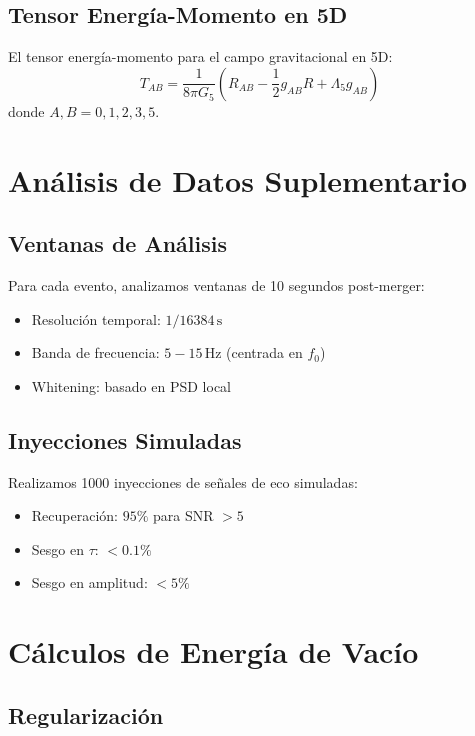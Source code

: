 \documentclass[12pt,a4paper]{article}
\begin{document}
\subsection{Tensor Energía-Momento en 5D}

El tensor energía-momento para el campo gravitacional en 5D:
\begin{equation}
T_{AB} = \frac{1}{8\pi G_5} \left(R_{AB} - \frac{1}{2}g_{AB}R + \Lambda_5 g_{AB}\right)
\end{equation}
donde $A, B = 0, 1, 2, 3, 5$.

\section{Análisis de Datos Suplementario}

\subsection{Ventanas de Análisis}

Para cada evento, analizamos ventanas de 10 segundos post-merger:
\begin{itemize}
    \item Resolución temporal: $1/16384\,\mathrm{s}$
    \item Banda de frecuencia: $5-15\,\mathrm{Hz}$ (centrada en $f_0$)
    \item Whitening: basado en PSD local
\end{itemize}

\subsection{Inyecciones Simuladas}

Realizamos 1000 inyecciones de señales de eco simuladas:
\begin{itemize}
    \item Recuperación: $95\%$ para SNR $> 5$
    \item Sesgo en $\tau$: $< 0.1\%$
    \item Sesgo en amplitud: $< 5\%$
\end{itemize}

\section{Cálculos de Energía de Vacío}

\subsection{Regularización}
\end{document}
